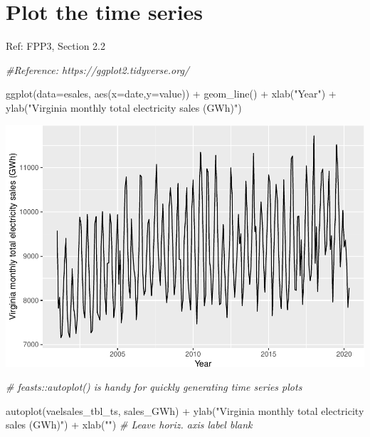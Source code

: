 \documentclass[
]{book}
\newenvironment{Shaded}{\begin{snugshade}}{\end{snugshade}}
\newcommand{\AttributeTok}[1]{\textcolor[rgb]{0.77,0.63,0.00}{#1}}
\newcommand{\CommentTok}[1]{\textcolor[rgb]{0.56,0.35,0.01}{\textit{#1}}}
\newcommand{\FunctionTok}[1]{\textcolor[rgb]{0.00,0.00,0.00}{#1}}
\newcommand{\NormalTok}[1]{#1}
\newcommand{\SpecialCharTok}[1]{\textcolor[rgb]{0.00,0.00,0.00}{#1}}
\newcommand{\StringTok}[1]{\textcolor[rgb]{0.31,0.60,0.02}{#1}}
\begin{document}
\hypertarget{plot-the-time-series}{%
\section{Plot the time series}\label{plot-the-time-series}}

Ref: FPP3, Section 2.2

\begin{Shaded}
\begin{Highlighting}[]
\CommentTok{\#Reference: https://ggplot2.tidyverse.org/}

\FunctionTok{ggplot}\NormalTok{(}\AttributeTok{data=}\NormalTok{esales, }\FunctionTok{aes}\NormalTok{(}\AttributeTok{x=}\NormalTok{date,}\AttributeTok{y=}\NormalTok{value)) }\SpecialCharTok{+}
  \FunctionTok{geom\_line}\NormalTok{() }\SpecialCharTok{+} \FunctionTok{xlab}\NormalTok{(}\StringTok{"Year"}\NormalTok{) }\SpecialCharTok{+} \FunctionTok{ylab}\NormalTok{(}\StringTok{"Virginia monthly total electricity sales (GWh)"}\NormalTok{)}
\end{Highlighting}
\end{Shaded}

\includegraphics{graphics/use ggplot2 to generate a plot-1.pdf}

\begin{Shaded}
\begin{Highlighting}[]
\CommentTok{\# feasts::autoplot() is handy for quickly generating time series plots}

\FunctionTok{autoplot}\NormalTok{(vaelsales\_tbl\_ts, sales\_GWh) }\SpecialCharTok{+}
  \FunctionTok{ylab}\NormalTok{(}\StringTok{"Virginia monthly total electricity sales (GWh)"}\NormalTok{) }\SpecialCharTok{+}
  \FunctionTok{xlab}\NormalTok{(}\StringTok{""}\NormalTok{)  }\CommentTok{\# Leave horiz. axis label blank}
\end{Highlighting}
\end{Shaded}
\end{document}
